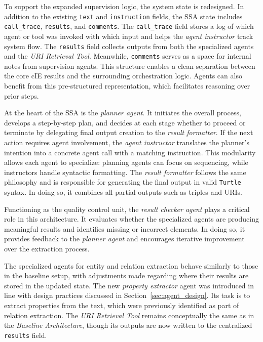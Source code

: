 \documentclass[a4paper,oneside,bibliography=totoc]{scrbook}
\begin{document}
To support the expanded supervision logic, the system state is redesigned. In addition to the existing \texttt{text} and \texttt{instruction} fields, the \ac{SSA} state includes \texttt{call\_trace}, \texttt{results}, and \texttt{comments}. The \texttt{call\_trace} field stores a log of which agent or tool was invoked with which input and helps the \textit{agent instructor} track system flow. The \texttt{results} field collects outputs from both the specialized agents and the \textit{URI Retrieval Tool}. Meanwhile, \texttt{comments} serves as a space for internal notes from supervision agents. This structure enables a clean separation between the core \ac{cIE} results and the surrounding orchestration logic. Agents can also benefit from this pre-structured representation, which facilitates reasoning over prior steps.

At the heart of the \ac{SSA} is the \textit{planner agent}. It initiates the overall process, develops a step-by-step plan, and decides at each stage whether to proceed or terminate by delegating final output creation to the \textit{result formatter}. If the next action requires agent involvement, the \textit{agent instructor} translates the planner's intention into a concrete agent call with a matching instruction. This modularity allows each agent to specialize: planning agents can focus on sequencing, while instructors handle syntactic formatting. The \textit{result formatter} follows the same philosophy and is responsible for generating the final output in valid \texttt{Turtle} syntax. In doing so, it combines all partial outputs such as triples and \acp{URI}.

Functioning as the quality control unit, the \textit{result checker agent} plays a critical role in this architecture. It evaluates whether the specialized agents are producing meaningful results and identifies missing or incorrect elements. In doing so, it provides feedback to the \textit{planner agent} and encourages iterative improvement over the extraction process.

The specialized agents for entity and relation extraction behave similarly to those in the baseline setup, with adjustments made regarding where their results are stored in the updated state. The new \textit{property extractor} agent was introduced in line with design practices discussed in Section~\ref{sec:agent_design}. Its task is to extract properties from the text, which were previously identified as part of relation extraction. The \textit{URI Retrieval Tool} remains conceptually the same as in the \textit{Baseline Architecture}, though its outputs are now written to the centralized \texttt{results} field.
\end{document}
